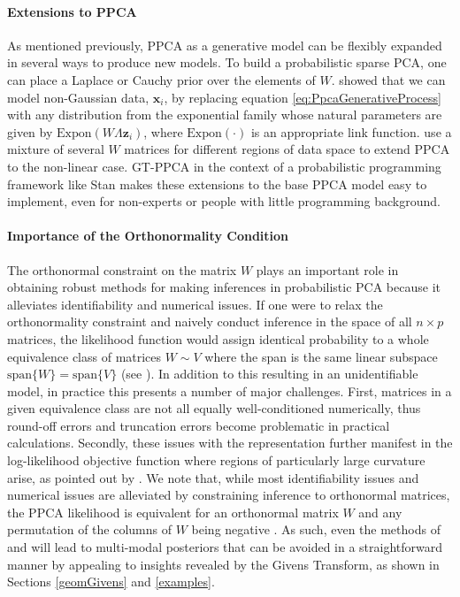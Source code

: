 \documentclass{article}
\newcommand{\mb}[1]{\mathbf{#1}}
\begin{document}
\paragraph{Extensions to PPCA}
As mentioned previously, PPCA as a generative model can be flexibly expanded in several ways to produce new models. To build a probabilistic sparse PCA, one can place a Laplace or Cauchy prior over the elements of $W$. \citet{mohamed2009bayesian} showed that we can model non-Gaussian data, $\mb{x}_i$, by replacing equation \ref{eq:PpcaGenerativeProcess} with any distribution from the exponential family whose natural parameters are given by $\mathrm{Expon}(W\Lambda \mb{z}_i)$, where $\mathrm{Expon}(\cdot)$ is an appropriate link function. \citet{ghahramani1996algorithm} use a mixture of several $W$ matrices for different regions of data space to extend PPCA to the non-linear case. GT-PPCA in the context of a probabilistic programming framework like Stan makes these extensions to the base PPCA model easy to implement, even for non-experts or people with little programming background.

\paragraph{Importance of the Orthonormality Condition}
The orthonormal constraint on the matrix $W$ plays an important role in obtaining robust methods for making inferences in probabilistic PCA because it alleviates identifiability and numerical issues.  If one were to relax the orthonormality constraint and naively conduct inference in the space of all $n\times p$ matrices, the likelihood function would assign identical probability to a whole equivalence class of matrices $W \sim V$ where the span is the same linear subspace $\mbox{span}\{W\} = \mbox{span}\{V\}$ (see \citet[chapt.~12.1.3]{murphy2012machine}).  In addition to this resulting in an unidentifiable model, in practice this presents a number of major challenges.  First, matrices in a given equivalence class are not all equally well-conditioned numerically, thus round-off errors and truncation errors become problematic in practical calculations.  Secondly, these issues with the representation further manifest in the log-likelihood objective function where regions of particularly large curvature arise, as pointed out by \citet{holbrook2016bayesian}. We note that, while most identifiability issues and numerical issues are alleviated by constraining inference to orthonormal matrices, the PPCA likelihood is equivalent for an orthonormal matrix $W$ and any permutation of the columns of $W$ being negative \citep[chapt.~12.1.3]{murphy2012machine,holbrook2016bayesian}. As such, even the methods of \citet{brubaker2012family} and \citet{byrne2013geodesic} will lead to multi-modal posteriors that can be avoided in a straightforward manner by appealing to insights revealed by the Givens Transform, as shown in Sections \ref{geomGivens} and \ref{examples}.
\end{document}
